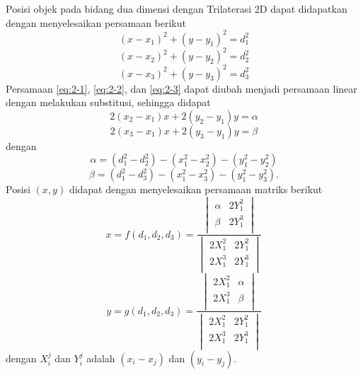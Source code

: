 Posisi objek pada bidang dua dimensi dengan Trilaterasi 2D dapat didapatkan dengan menyelesaikan persamaan berikut
\begin{equation}
	\left(x-x_1\right)^2 + \left(y-y_1\right)^2=d_1^2
	\label{eq:2-1}
\end{equation}
\begin{equation}
	\left(x-x_2\right)^2 + \left(y-y_2\right)^2=d_2^2
	\label{eq:2-2}
\end{equation}
\begin{equation}
	\left(x-x_3\right)^2 + \left(y-y_3\right)^2=d_3^2
	\label{eq:2-3}
\end{equation}
Persamaan \ref{eq:2-1}, \ref{eq:2-2}, dan \ref{eq:2-3} dapat diubah menjadi persamaan linear dengan melakukan substitusi, sehingga didapat
$$2\left(x_2-x_1\right)x +2 \left(y_2-y_1\right)y=\alpha$$
$$2\left(x_3-x_1\right)x+ 2\left(y_3-y_1\right)y=\beta$$
dengan
$$\alpha=\left(d_1^2-d_2^2\right)-\left(x_1^2-x_2^2\right)-\left(y_1^2-y_2^2\right)$$
$$\beta=\left(d_1^2-d_3^2\right)-\left(x_1^2-x_3^2\right)-\left(y_1^2-y_3^2\right).$$
Posisi $\left(x,y\right)$ didapat dengan menyelesaikan persamaan matriks berikut
$$x=f\left(d_1,d_2,d_3\right)=\frac{
	\begin{vmatrix}
		\alpha & 2Y_1^2 \\
		\beta & 2Y_1^3 \\
\end{vmatrix}}
{
	\begin{vmatrix}
		2X_1^2 & 2Y_1^2 \\
		2X_1^3 & 2Y_1^3 \\
	\end{vmatrix}
}$$
$$y=g\left(d_1,d_2,d_3\right)=\frac{
	\begin{vmatrix}
		2X_1^2 & \alpha \\
		2X_1^3 & \beta \\
\end{vmatrix}}
{
	\begin{vmatrix}
		2X_1^2 & 2Y_1^2 \\
		2X_1^3 & 2Y_1^3 \\
	\end{vmatrix}
}$$
dengan $X_i^j$ dan $Y_i^j$ adalah $\left(x_i-x_j\right)$ dan $\left(y_i-y_j\right)$.

